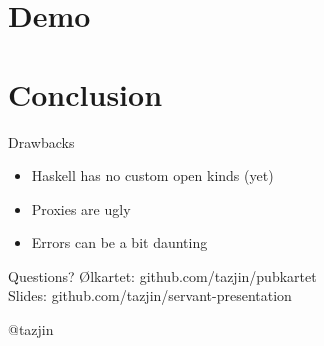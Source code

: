 \documentclass[12pt]{beamer}
\begin{document}
\section{Demo}

\section{Conclusion}

\begin{frame}{Drawbacks}
  \begin{itemize}
  \item Haskell has no custom open kinds (yet)
  \item Proxies are ugly
  \item Errors can be a bit daunting
  \end{itemize}
\end{frame}

\begin{frame}{Questions?}
  Ølkartet: github.com/tazjin/pubkartet \\
  Slides: github.com/tazjin/servant-presentation

  @tazjin
\end{frame}
\end{document}
